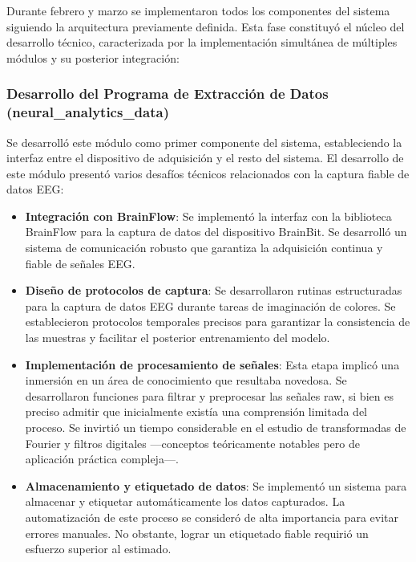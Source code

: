 Durante febrero y marzo se implementaron todos los componentes del sistema siguiendo la arquitectura previamente definida. Esta fase constituyó el núcleo del desarrollo técnico, caracterizada por la implementación simultánea de múltiples módulos y su posterior integración:

\subsubsection{Desarrollo del Programa de Extracción de Datos (neural\_analytics\_data)}

Se desarrolló este módulo como primer componente del sistema, estableciendo la interfaz entre el dispositivo de adquisición y el resto del sistema. El desarrollo de este módulo presentó varios desafíos técnicos relacionados con la captura fiable de datos EEG:

\begin{itemize}
    \item \textbf{Integración con BrainFlow}: Se implementó la interfaz con la biblioteca BrainFlow para la captura de datos del dispositivo BrainBit. Se desarrolló un sistema de comunicación robusto que garantiza la adquisición continua y fiable de señales EEG.
    
    \item \textbf{Diseño de protocolos de captura}: Se desarrollaron rutinas estructuradas para la captura de datos EEG durante tareas de imaginación de colores. Se establecieron protocolos temporales precisos para garantizar la consistencia de las muestras y facilitar el posterior entrenamiento del modelo.
    
    \item \textbf{Implementación de procesamiento de señales}: Esta etapa implicó una inmersión en un área de conocimiento que resultaba novedosa. Se desarrollaron funciones para filtrar y preprocesar las señales raw, si bien es preciso admitir que inicialmente existía una comprensión limitada del proceso. Se invirtió un tiempo considerable en el estudio de transformadas de Fourier y filtros digitales —conceptos teóricamente notables pero de aplicación práctica compleja—.
    
    \item \textbf{Almacenamiento y etiquetado de datos}: Se implementó un sistema para almacenar y etiquetar automáticamente los datos capturados. La automatización de este proceso se consideró de alta importancia para evitar errores manuales. No obstante, lograr un etiquetado fiable requirió un esfuerzo superior al estimado.
\end{itemize}

